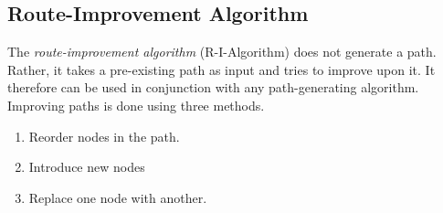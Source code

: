 \subsection{Route-Improvement Algorithm}
\label{subsec:03:rialgo}

The \emph{route-improvement algorithm} (R-I-Algorithm) does not generate a path.
Rather, it takes a pre-existing path as input and tries to improve upon it.
It therefore can be used in conjunction with any path-generating algorithm.
Improving paths is done using three methods.

\begin{enumerate}
    \item Reorder nodes in the path.
    \item Introduce new nodes
    \item Replace one node with another.
\end{enumerate}

